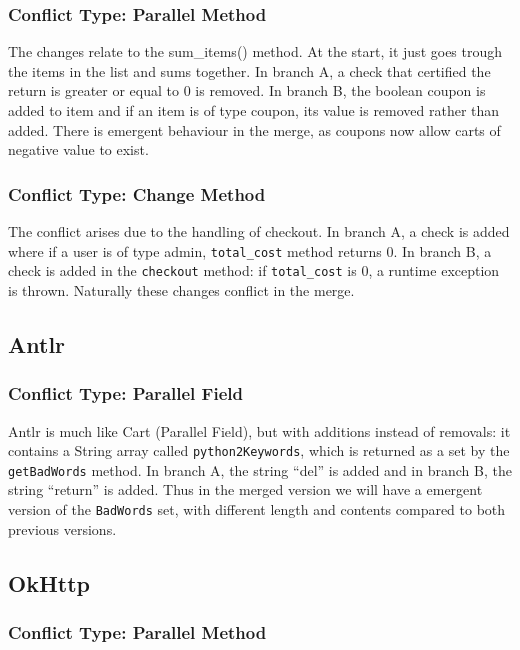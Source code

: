 \subsubsection{Conflict Type: Parallel Method}

The changes relate to the sum\_items() method. At the start, it just goes trough the items in the list and sums together. In branch A,
a check that certified the return is greater or equal to 0 is removed. In branch B, the boolean coupon is added to item and if an item
is of type coupon, its value is removed rather than added. There is emergent behaviour in the merge, as coupons now allow carts of negative
value to exist.

\subsubsection{Conflict Type: Change Method}

The conflict arises due to the handling of checkout. In branch A, a check is added where if a user is of type admin,
\texttt{total\_cost} method returns 0. In branch B, a check is added in the \texttt{checkout} method: if \texttt{total\_cost} is 0, a runtime exception is thrown.
Naturally these changes conflict in the merge.

\subsection{Antlr}

\subsubsection{Conflict Type: Parallel Field}

Antlr is much like Cart (Parallel Field), but with additions instead of removals: it contains a String array called \texttt{python2Keywords}, which is returned as a set by the \texttt{getBadWords} method.
In branch A, the string ``del'' is added and in branch B, the string ``return'' is added.
Thus in the merged version we will have a emergent version of the \texttt{BadWords}
set, with different length and contents compared to both previous versions.

\subsection{OkHttp}

\subsubsection{Conflict Type: Parallel Method}


